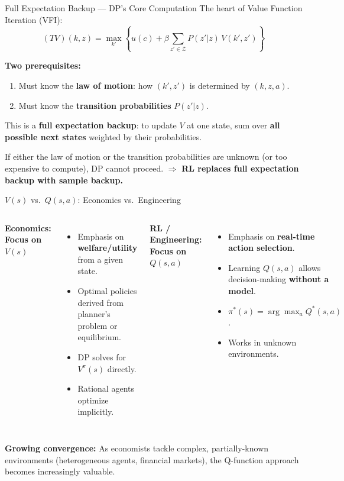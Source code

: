 \documentclass[10pt,english,aspectratio=169]{beamer}
\begin{document}
\begin{frame}{Full Expectation Backup --- DP's Core Computation}
The heart of Value Function Iteration (VFI):
\[
(TV)(k,z) = \max_{k'} \left\{ u(c) + \beta \sum_{z' \in \mathcal{Z}} P(z'|z) \, V(k',z') \right\}
\]

\vspace{0.3cm}
\textbf{Two prerequisites:}
\begin{enumerate}
    \item Must know the \textbf{law of motion}: how $(k', z')$ is determined by $(k, z, a)$.
    \item Must know the \textbf{transition probabilities} $P(z'|z)$.
\end{enumerate}

\vspace{0.3cm}
This is a \textbf{full expectation backup}: to update $V$ at one state, sum over \textbf{all possible next states} weighted by their probabilities.

\vspace{0.3cm}
\begin{tcolorbox}[colback=VeryLightGray,colframe=RedTitle!60]
If either the law of motion or the transition probabilities are unknown (or too expensive to compute), DP cannot proceed. $\Rightarrow$ \textbf{RL replaces full expectation backup with sample backup.}
\end{tcolorbox}
\end{frame}


\begin{frame}{$V(s)$ vs.\ $Q(s,a)$: Economics vs.\ Engineering}
\begin{columns}
\textbf{Economics: Focus on $V(s)$}
\begin{itemize}
    \item Emphasis on \textbf{welfare/utility} from a given state.
    \item Optimal policies derived from planner's problem or equilibrium.
    \item DP solves for $V^\pi(s)$ directly.
    \item Rational agents optimize implicitly.
\end{itemize}

\textbf{RL / Engineering: Focus on $Q(s,a)$}
\begin{itemize}
    \item Emphasis on \textbf{real-time action selection}.
    \item Learning $Q(s,a)$ allows decision-making \textbf{without a model}.
    \item $\pi^*(s) = \arg\max_a Q^*(s,a)$.
    \item Works in unknown environments.
\end{itemize}
\end{columns}

\vspace{0.5cm}
\textbf{Growing convergence:} As economists tackle complex, partially-known environments (heterogeneous agents, financial markets), the Q-function approach becomes increasingly valuable.
\end{frame}
\end{document}
